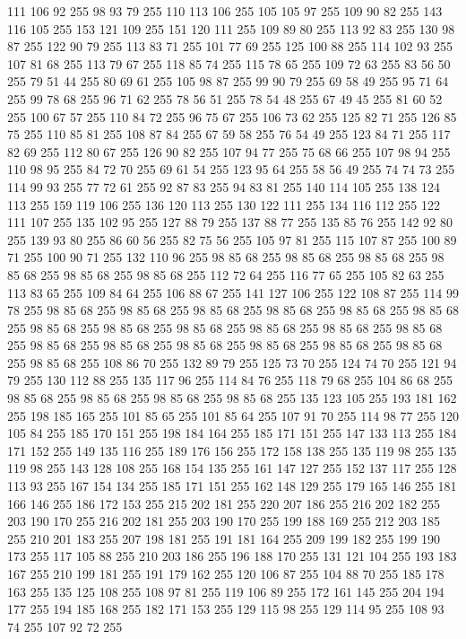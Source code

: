 111 106 92 255 98 93 79 255 110 113 106 255 105 105 97 255 109 90 82 255 143 116 105 255 153 121 109 255 151 120 111 255 109 89 80 255 113 92 83 255 130 98 87 255 122 90 79 255 113 83 71 255 101 77 69 255 125 100 88 255 114 102 93 255 107 81 68 255 113 79 67 255 118 85 74 255 115 78 65 255 109 72 63 255 83 56 50 255 79 51 44 255 80 69 61 255 105 98 87 255 99 90 79 255 69 58 49 255 95 71 64 255 99 78 68 255 96 71 62 255 78 56 51 255 78 54 48 255 67 49 45 255 81 60 52 255 100 67 57 255 110 84 72 255 96 75 67 255 106 73 62 255 125 82 71 255 126 85 75 255 110 85 81 255 108 87 84 255 67 59 58 255 76 54 49 255 123 84 71 255 117 82 69 255 112 80 67 255 126 90 82 255 107 94 77 255 75 68 66 255 107 98 94 255 110 98 95 255 84 72 70 255 69 61 54 255 123 95 64 255 58 56 49 255 74 74 73 255 114 99 93 255 77 72 61 255 92 87 83 255 94 83 81 255 140 114 105 255 138 124 113 255 159 119 106 255
136 120 113 255 130 122 111 255 134 116 112 255 122 111 107 255 135 102 95 255 127 88 79 255 137 88 77 255 135 85 76 255 142 92 80 255 139 93 80 255 86 60 56 255 82 75 56 255 105 97 81 255 115 107 87 255 100 89 71 255 100 90 71 255 132 110 96 255 98 85 68 255 98 85 68 255 98 85 68 255 98 85 68 255 98 85 68 255 98 85 68 255 112 72 64 255 116 77 65 255 105 82 63 255 113 83 65 255 109 84 64 255 106 88 67 255 141 127 106 255 122 108 87 255 114 99 78 255 98 85 68 255 98 85 68 255 98 85 68 255 98 85 68 255 98 85 68 255 98 85 68 255 98 85 68 255 98 85 68 255 98 85 68 255 98 85 68 255 98 85 68 255 98 85 68 255 98 85 68 255 98 85 68 255 98 85 68 255 98 85 68 255 98 85 68 255 98 85 68 255 98 85 68 255 108 86 70 255 132 89 79 255 125 73 70 255 124 74 70 255 121 94 79 255 130 112 88 255 135 117 96 255 114 84 76 255 118 79 68 255 104 86 68 255 98 85 68 255 98 85 68 255 98 85 68 255
98 85 68 255 135 123 105 255 193 181 162 255 198 185 165 255 101 85 65 255 101 85 64 255 107 91 70 255 114 98 77 255 120 105 84 255 185 170 151 255 198 184 164 255 185 171 151 255 147 133 113 255 184 171 152 255 149 135 116 255 189 176 156 255 172 158 138 255 135 119 98 255 135 119 98 255 143 128 108 255 168 154 135 255 161 147 127 255 152 137 117 255 128 113 93 255 167 154 134 255 185 171 151 255 162 148 129 255 179 165 146 255 181 166 146 255 186 172 153 255 215 202 181 255 220 207 186 255 216 202 182 255 203 190 170 255 216 202 181 255 203 190 170 255 199 188 169 255 212 203 185 255 210 201 183 255 207 198 181 255 191 181 164 255 209 199 182 255 199 190 173 255 117 105 88 255 210 203 186 255 196 188 170 255 131 121 104 255 193 183 167 255 210 199 181 255 191 179 162 255 120 106 87 255 104 88 70 255 185 178 163 255 135 125 108 255 108 97 81 255 119 106 89 255 172 161 145 255 204 194 177 255 194 185 168 255 182 171 153 255 129 115 98 255 129 114 95 255 108 93 74 255 107 92 72 255
